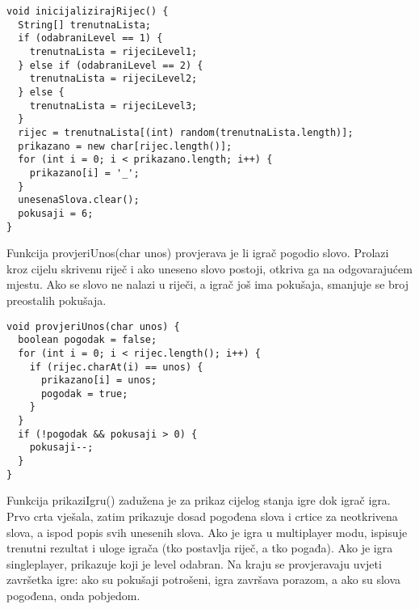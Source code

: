 \documentclass{article}
\begin{document}
\begin{verbatim}
void inicijalizirajRijec() {
  String[] trenutnaLista;
  if (odabraniLevel == 1) {
    trenutnaLista = rijeciLevel1;
  } else if (odabraniLevel == 2) {
    trenutnaLista = rijeciLevel2;
  } else {
    trenutnaLista = rijeciLevel3;
  }
  rijec = trenutnaLista[(int) random(trenutnaLista.length)];
  prikazano = new char[rijec.length()];
  for (int i = 0; i < prikazano.length; i++) {
    prikazano[i] = '_';
  }
  unesenaSlova.clear();
  pokusaji = 6;
}
\end{verbatim}

Funkcija provjeriUnos(char unos) provjerava je li igrač pogodio slovo. Prolazi kroz cijelu skrivenu riječ i ako uneseno slovo postoji, otkriva ga na odgovarajućem mjestu. Ako se slovo ne nalazi u riječi, a igrač još ima pokušaja, smanjuje se broj preostalih pokušaja.

\begin{verbatim}
void provjeriUnos(char unos) {
  boolean pogodak = false;
  for (int i = 0; i < rijec.length(); i++) {
    if (rijec.charAt(i) == unos) {
      prikazano[i] = unos;
      pogodak = true;
    }
  }
  if (!pogodak && pokusaji > 0) {
    pokusaji--;
  }
}
\end{verbatim}

Funkcija prikaziIgru() zadužena je za prikaz cijelog stanja igre dok igrač igra. Prvo crta vješala, zatim prikazuje dosad pogođena slova i crtice za neotkrivena slova, a ispod popis svih unesenih slova. Ako je igra u multiplayer modu, ispisuje trenutni rezultat i uloge igrača (tko postavlja riječ, a tko pogađa). Ako je igra singleplayer, prikazuje koji je level odabran. Na kraju se provjeravaju uvjeti završetka igre: ako su pokušaji potrošeni, igra završava porazom, a ako su slova pogođena, onda pobjedom.
\end{document}
